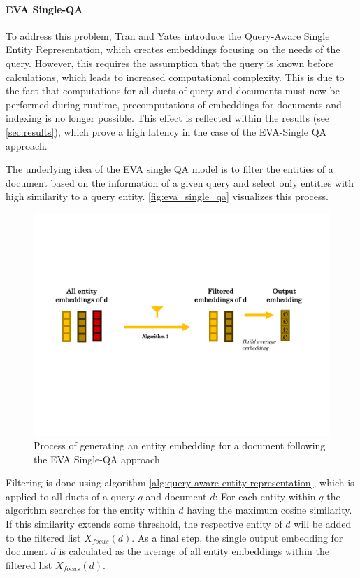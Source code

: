\paragraph*{EVA Single-QA}

To address this problem, Tran and Yates introduce the Query-Aware Single Entity Representation, which creates embeddings focusing on the needs of the query. However, this requires the assumption that the query is known before calculations, which leads to increased computational complexity. This is due to the fact that computations for all duets of query and documents must now be performed during runtime, precomputations of embeddings for documents and indexing is no longer possible. This effect is reflected within the results (see \autoref{sec:results}), which prove a high latency in the case of the EVA-Single QA approach.

The underlying idea of the EVA single QA model is to filter the entities of a document based on the information of a given query and select only entities with high similarity to a query entity. \autoref{fig:eva_single_qa} visualizes this process.

\begin{figure}[!htb]
    \centering
    \includegraphics[trim={1cm 6.5cm 2cm 6cm}, clip, width=\textwidth]{resources/eva_single_qa} 
    \caption{Process of generating an entity embedding for a document following the EVA Single-QA approach}
    \label{fig:eva_single_qa}
\end{figure}

Filtering is done using algorithm \ref{alg:query-aware-entity-representation}, which is applied to all duets of a query $q$ and document $d$: For each entity within $q$ the algorithm searches for the entity within $d$ having the maximum cosine similarity. If this similarity extends some threshold, the respective entity of $d$ will be added to the filtered list $X_{focus}(d)$. As a final step, the single output embedding for document $d$ is calculated as the average of all entity embeddings within the filtered list $X_{focus}(d)$.


